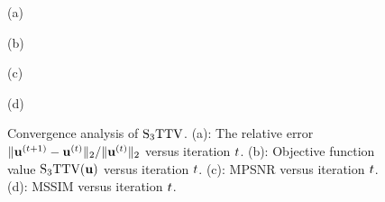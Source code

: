 \begin{figure}[t]
\begin{center}
        \begin{minipage}{0.240\hsize}
            \centerline{\small{(a)}}
		\end{minipage}
		\begin{minipage}{0.240\hsize}
			\centerline{\small{(b)}}
		\end{minipage}
		\begin{minipage}{0.240\hsize}
			\centerline{\small{(c)}}
		\end{minipage}
		\begin{minipage}{0.240\hsize}
			\centerline{\small{(d)}}
		\end{minipage}
    \end{center}
	
    \vspace{-3mm}
    \caption{Convergence analysis of ${\text{S}_{3} \text{TTV}}$. (a): The relative error $\| \mathbf{u}^{(t+1)} - \mathbf{u}^{(t)} \|_2 / \| \mathbf{u}^{(t)}\|_{2}$ versus iteration $t$. (b): Objective function value ${\text{S}_{3} \text{TTV}}(\mathbf{u})$ versus iteration $t$. (c): MPSNR versus iteration $t$. (d): MSSIM  versus iteration $t$. }
    \label{fig:Conv_Anal}
\end{figure}